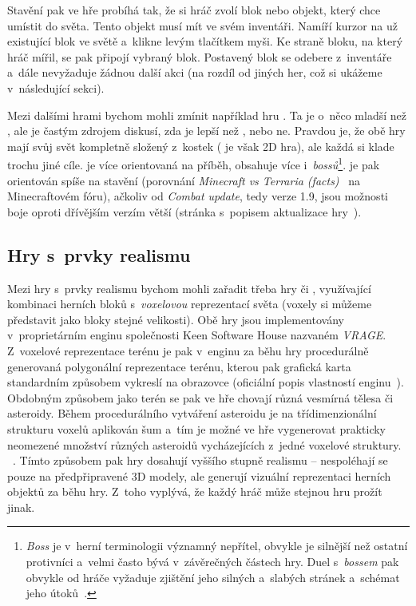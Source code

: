 \FloatBarrier

Stavění pak ve hře probíhá tak, že si hráč zvolí blok nebo objekt, který chce umístit do světa. Tento objekt musí mít ve svém inventáři. Namíří kurzor na už existující blok ve světě a~klikne levým tlačítkem myši. Ke straně bloku, na který hráč mířil, se pak připojí vybraný blok. Postavený blok se odebere z~inventáře a~dále nevyžaduje žádnou další akci (na rozdíl od jiných her, což si ukážeme v~následující sekci).


Mezi dalšími hrami bychom mohli zmínit například hru \TE{}. Ta je o~něco mladší než \MC{}, ale je častým zdrojem diskusí, zda je lepší než \MC{}, nebo ne. Pravdou je, že obě hry mají svůj svět kompletně složený z~kostek (\TE{} je však 2D hra), ale každá si klade trochu jiné cíle. \TE{} je více orientovaná na příběh, obsahuje více \NPC{} i~\textit{bossů}\footnote{\textit{Boss} je v~herní terminologii významný nepřítel, obvykle je silnější než ostatní protivníci a~velmi často bývá v~závěrečných částech hry. Duel s~\textit{bossem} pak obvykle od hráče vyžaduje zjištění jeho silných a~slabých stránek a~schémat jeho útoků~\citep{intro_boss}.}. \MC{} je pak orientován spíše na stavění (porovnání \textit{Minecraft vs Terraria (facts)}~\citep{mc_te_comparsion} na Minecraftovém fóru), ačkoliv od \textit{Combat update}, tedy verze 1.9, jsou možnosti boje oproti dřívějším verzím větší (stránka s~popisem aktualizace hry~\citep{mc_combat}). 


\subsection{Hry s~prvky realismu}

Mezi hry s~prvky realismu bychom mohli zařadit třeba hry \SE{} či \ME{}, využívající kombinaci herních bloků s~\textit{voxelovou} reprezentací světa (voxely si můžeme představit jako bloky stejné velikosti). Obě hry jsou implementovány v~proprietárním enginu společnosti Keen Software House nazvaném \textit{VRAGE}\texttrademark{}. Z~voxelové reprezentace terénu je pak v~enginu za běhu hry procedurálně generovaná polygonální reprezentace terénu, kterou pak grafická karta standardním způsobem vykreslí na obrazovce (oficiální popis vlastností enginu~\citep{vrage}). Obdobným způsobem jako terén se pak ve hře \SE{} chovají různá vesmírná tělesa či asteroidy. Během procedurálního vytváření asteroidu je na třídimenzionální strukturu voxelů aplikován šum a~tím je možné ve hře vygenerovat prakticky neomezené množství různých asteroidů vycházejících z~jedné voxelové struktury. ~\citep{rosa_blog}. Tímto způsobem pak hry dosahují vyššího stupně realismu -- nespoléhají se pouze na předpřipravené 3D modely, ale generují vizuální reprezentaci herních objektů za běhu hry. Z~toho vyplývá, že každý hráč může stejnou hru prožít jinak. 

